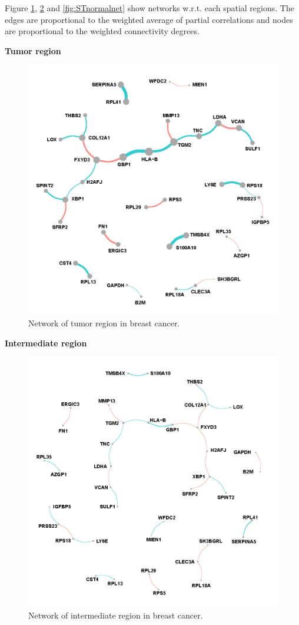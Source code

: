 \documentclass[
]{book}
\begin{document}
Figure \ref{fig:STtumornet}, \ref{fig:STinternet} and \ref{fig:STnormalnet} show networks w.r.t. each spatial regions. The edges are proportional to the weighted average of partial correlations and nodes are proportional to the weighted connectivity degrees.

\textbf{Tumor region}

\begin{figure}

{\centering \includegraphics[width=0.7\linewidth]{images/location_c3_full} 

}

\caption{Network of tumor region in breast cancer.}\label{fig:STtumornet}
\end{figure}

\textbf{Intermediate region}

\begin{figure}

{\centering \includegraphics[width=0.7\linewidth]{images/location_c2_full} 

}

\caption{Network of intermediate region in breast cancer.}\label{fig:STinternet}
\end{figure}
\end{document}

